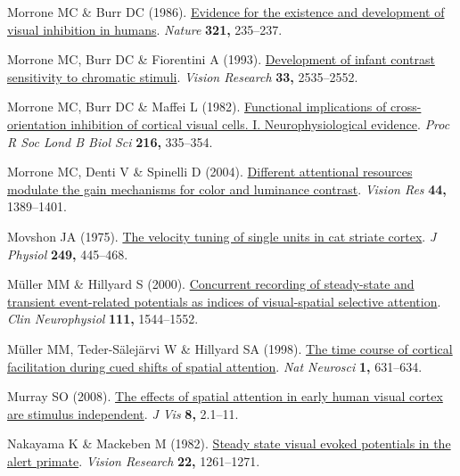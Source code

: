 \documentclass[
  letterpaper,
  DIV=11,
  numbers=noendperiod]{scrartcl}
\newlength{\cslhangindent}
\newenvironment{CSLReferences}[2] %
 {\begin{list}{}{%
  \setlength{\itemindent}{0pt}
  \setlength{\leftmargin}{0pt}
  \setlength{\parsep}{0pt}
  \ifodd #1
   \setlength{\leftmargin}{\cslhangindent}
   \setlength{\itemindent}{-1\cslhangindent}
  \fi
  \setlength{\itemsep}{#2\baselineskip}}}
 {\end{list}}
\begin{document}
\begin{CSLReferences}{1}{1}
Morrone MC \& Burr DC (1986).
\href{https://doi.org/10.1038/321235a0}{Evidence for the existence and
development of visual inhibition in humans}. \emph{Nature} \textbf{321,}
235--237.

Morrone MC, Burr DC \& Fiorentini A (1993).
\href{https://doi.org/10.1016/0042-6989(93)90133-H}{Development of
infant contrast sensitivity to chromatic stimuli}. \emph{Vision
Research} \textbf{33,} 2535--2552.

Morrone MC, Burr DC \& Maffei L (1982).
\href{https://doi.org/10.1098/rspb.1982.0078}{Functional implications of
cross-orientation inhibition of cortical visual cells. I.
Neurophysiological evidence}. \emph{Proc R Soc Lond B Biol Sci}
\textbf{216,} 335--354.

Morrone MC, Denti V \& Spinelli D (2004).
\href{https://doi.org/10.1016/j.visres.2003.10.014}{Different
attentional resources modulate the gain mechanisms for color and
luminance contrast}. \emph{Vision Res} \textbf{44,} 1389--1401.

Movshon JA (1975).
\href{https://doi.org/10.1113/jphysiol.1975.sp011025}{The velocity
tuning of single units in cat striate cortex}. \emph{J Physiol}
\textbf{249,} 445--468.

Müller MM \& Hillyard S (2000).
\href{https://doi.org/10.1016/s1388-2457(00)00371-0}{Concurrent
recording of steady-state and transient event-related potentials as
indices of visual-spatial selective attention}. \emph{Clin Neurophysiol}
\textbf{111,} 1544--1552.

Müller MM, Teder-Sälejärvi W \& Hillyard SA (1998).
\href{https://doi.org/10.1038/2865}{The time course of cortical
facilitation during cued shifts of spatial attention}. \emph{Nat
Neurosci} \textbf{1,} 631--634.

Murray SO (2008). \href{https://doi.org/10.1167/8.10.2}{The effects of
spatial attention in early human visual cortex are stimulus
independent}. \emph{J Vis} \textbf{8,} 2.1--11.

Nakayama K \& Mackeben M (1982).
\href{https://doi.org/10.1016/0042-6989(82)90138-9}{Steady state visual
evoked potentials in the alert primate}. \emph{Vision Research}
\textbf{22,} 1261--1271.


\end{CSLReferences}
\end{document}
